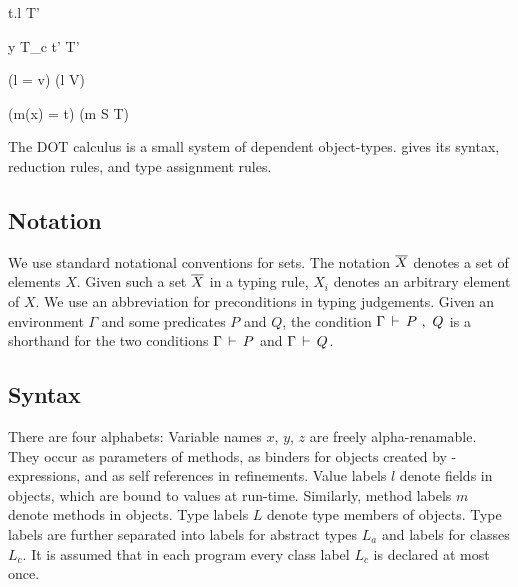 \documentclass[9pt]{sigplanconf}
\begin{document}
{\begin{multicols}{2}[]
{\Gamma \ts t.l \typ T'}

{\Gamma \ts \new y {T_c } {t'} \typ T'}

\end{multicols}

\linesep

\begin{multicols}{2}[]

{\Gamma \ts (l = v) \typ (\ldecl l V)}

{\Gamma \ts (m(x) = t) \typ (\mdecl m S T) }

\end{multicols}

} %

The DOT calculus is a small system of dependent
object-types.  gives its syntax, reduction rules,
and type assignment rules.

\subsection{Notation} We use standard notational conventions for
sets. The notation $\overline{X}$ denotes a set of elements $X$. Given
such a set $\overline{X}$ in a typing rule, $X_i$ denotes an arbitrary
element of $X$. 
We use an
abbreviation for preconditions in typing judgements. Given an
environment $\Gamma$ and some predicates $P$ and $Q$, the condition $\Gamma \,\vdash\, P ~,~ Q$
is a shorthand for the two conditions $\Gamma \,\vdash\, P$ and $\Gamma \,\vdash\, Q$.

\subsection{Syntax}

There are four alphabets: Variable names $x$, $y$, $z$ are freely
alpha-renamable. They occur as parameters of methods, as
binders for objects created by \verb@new@-expressions, and as self
references in refinements. Value labels $l$ denote fields in objects,
which are bound to values at run-time. Similarly, method labels $m$
denote methods in objects. Type labels $L$ denote type members of
objects. Type labels are further separated into labels for abstract
types $L_a$ and labels for classes $L_c$. It is assumed that in each
program every class label $L_c$ is declared at most once.
\end{document}
